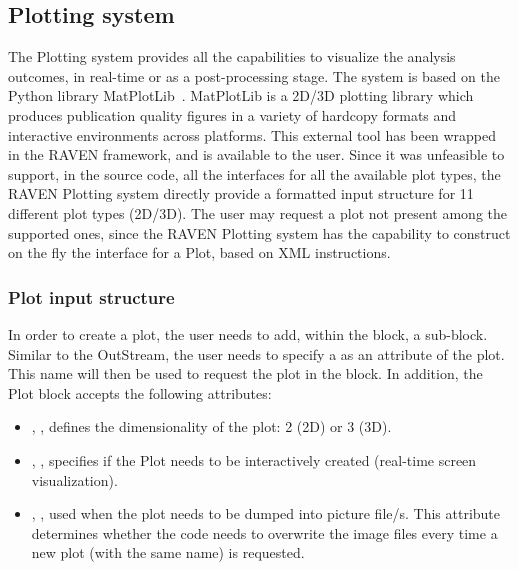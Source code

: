 \subsection{Plotting system \label{sec:plotting}}
The Plotting system provides all the capabilities to visualize the analysis
outcomes, in real-time or as a post-processing stage.
%
The system is based on the Python library MatPlotLib~\cite{MatPlotLib}.
%
MatPlotLib is a 2D/3D plotting library which produces publication quality
figures in a variety of hardcopy formats and interactive environments across
platforms.
%
This external tool has been wrapped in the RAVEN framework, and is available to
the user.
%
Since it was unfeasible to support, in the source code, all the interfaces for
all the available plot types, the RAVEN Plotting system directly provide a
formatted input structure for 11 different plot types (2D/3D).
%
The user may request a plot not present among the supported ones, since the
RAVEN Plotting system has the capability to construct on the fly the interface
for a Plot, based on XML instructions.
%
%
\subsubsection{Plot input structure \label{sec:PlotInputStructure}}
In order to create a plot, the user needs to add, within the
 block, a  sub-block.
%
Similar to the  OutStream, the user needs to specify a
 as an attribute of the plot.
%
This name will then be used to request the plot in the  block.
%
In addition, the Plot block accepts the following attributes:

\vspace{-5mm}
\begin{itemize}
  \itemsep0em
  \item {}, , defines the
  dimensionality of the plot: 2 (2D) or 3 (3D).
  \item {}, , specifies if
  the Plot needs to be interactively created (real-time screen visualization).
  \item {}, , used when the
  plot needs to be dumped into picture file/s. This attribute determines whether
  the code needs to overwrite the image files every time a new plot (with the
  same name) is requested.
\end{itemize}
\vspace{-5mm}

